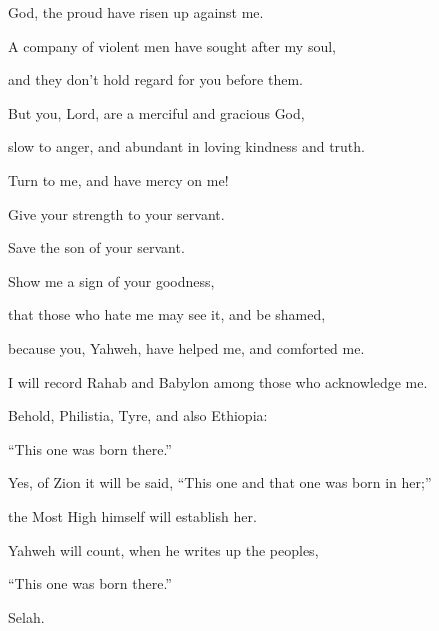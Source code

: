 {\par }{\Q {}God, the proud have risen up against me.
\par }{\QB A company of violent men have sought after my soul,
\par }{\QB and they don’t hold regard for you before them.
\par }{\Q {}But you, Lord, are a merciful and gracious God,
\par }{\QB slow to anger, and abundant in loving kindness and truth.
\par }{\Q {}Turn to me, and have mercy on me!
\par }{\QB Give your strength to your servant.
\par }{\QB Save the son of your servant.
\par }{\Q {}Show me a sign of your goodness,
\par }{\QB that those who hate me may see it, and be shamed,
\par }{\QB because you, Yahweh, have helped me, and comforted me.

\par }
{\Q {}I will record Rahab and Babylon among those who acknowledge me.
\par }{\QB Behold, Philistia, Tyre, and also Ethiopia:
\par }{\QB “This one was born there.”
\par }{\Q {}Yes, of Zion it will be said, “This one and that one was born in her;”
\par }{\QB the Most High himself will establish her.
\par }{\Q {}Yahweh will count, when he writes up the peoples,
\par }{\QB “This one was born there.”
\par }{\QS Selah.\par }
